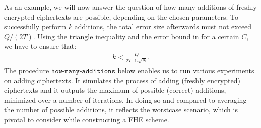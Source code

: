 \documentclass[letterpaper,10pt,english]{jupyterBook}
\begin{document}
\sphinxAtStartPar
As an example, we will now answer the question of how many additions of freshly encrypted ciphertexts are possible, depending on the chosen parameters.
To successfully perform \(k\) additions, the total error size afterwards must not exceed \(Q/(2T)\).
Using the triangle inequality and the error bound in {\hyperref[\detokenize{Thesis:error-after-BFV-encryption}]{}} for a certain \(C\), we have to ensure that:
\begin{equation}\label{equation:Thesis:number-of-additions}
\begin{split}k < \frac{Q}{2T\cdot C \sqrt{N}}.\end{split}
\end{equation}
\sphinxAtStartPar
The procedure \(\texttt{how-many-additions}\) below enables us to run various experiments on adding ciphertexts.
It simulates the process of adding (freshly encrypted) ciphertexts and it outputs the maximum of possible (correct) additions, minimized over a number of iterations.
In doing so and compared to averaging the number of possible additions, it reflects the worst\sphinxhyphen{}case scenario, which is pivotal to consider while constructing a FHE scheme.
\end{document}
